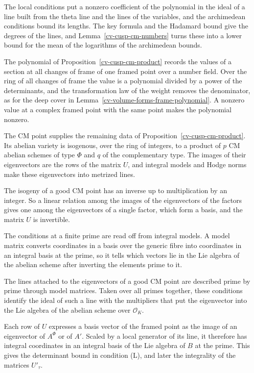 The local conditions put a nonzero coefficient of the polynomial in the ideal of a line built from the theta
line and the lines of the variables, and the archimedean conditions bound its lengths. The key formula and the
Hadamard bound give the degrees of the lines, and Lemma~\ref{cv-cusp-cm-numbers} turns these into a lower
bound for the mean of the logarithms of the archimedean bounds.

The polynomial of Proposition~\ref{cv-cusp-cm-product} records the values of a section at all changes of frame of
one framed point over a number field. Over the ring of all changes of frame the value is a polynomial divided by a
power of the determinants, and the transformation law of the weight removes the denominator, as for the deep cover
in Lemma~\ref{cv-volume-forms-frame-polynomial}. A nonzero value at a complex framed point with the same point makes
the polynomial nonzero.

The CM point supplies the remaining data of Proposition~\ref{cv-cusp-cm-product}. Its abelian variety is
isogenous, over the ring of integers, to a product of $p$ CM abelian schemes of type $\Phi$ and $q$ of the
complementary type. The images of their eigenvectors are the rows of the matrix $U$, and integral models and Hodge
norms make these eigenvectors into metrized lines.

The isogeny of a good CM point has an inverse up to multiplication by an integer. So a linear relation among the
images of the eigenvectors of the factors gives one among the eigenvectors of a single factor, which form a basis,
and the matrix $U$ is invertible.

The conditions at a finite prime are read off from integral models. A model matrix converts coordinates in a basis
over the generic fibre into coordinates in an integral basis at the prime, so it tells which vectors lie in the
Lie algebra of the abelian scheme after inverting the elements prime to it.

The lines attached to the eigenvectors of a good CM point are described prime by prime through model matrices.
Taken over all primes together, these conditions identify the ideal of such a line with the multipliers that put
the eigenvector into the Lie algebra of the abelian scheme over $\mathcal O_K$.

Each row of $U$ expresses a basis vector of the framed point as the image of an eigenvector of $A^\Phi$ or of $A'$.
Scaled by a local generator of its line, it therefore has integral coordinates in an integral basis of the Lie
algebra of $B$ at the prime. This gives the determinant bound in condition (L), and later the integrality of the
matrices $U'_\tau$.

